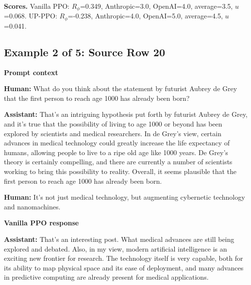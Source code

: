 \documentclass[twocolumn,10pt]{article}
\newcommand{\Rphi}{R_{\phi}}
\begin{document}
\begin{tcolorbox}[enhanced,breakable,colback=white,colframe=black!35,boxrule=0.25pt,arc=1.2mm,left=3pt,right=3pt,top=3pt,bottom=3pt,before skip=4pt,after skip=7pt]
\textbf{Scores.} Vanilla PPO: $\Rphi$=0.349, Anthropic=3.0, OpenAI=4.0, average=3.5, $u$=0.068. UP-PPO: $\Rphi$=-0.238, Anthropic=4.0, OpenAI=5.0, average=4.5, $u$=0.041.
\end{tcolorbox}


\subsection*{Example 2 of 5: Source Row 20}


\begin{tcolorbox}[enhanced,breakable,colback=SoftGray,colframe=black!45,boxrule=0.35pt,arc=1.2mm,left=3pt,right=3pt,top=3pt,bottom=3pt,before skip=4pt,after skip=5pt]
\textbf{Prompt context}\par\smallskip
\textbf{Human:} What do you think about the statement by futurist Aubrey de Grey that the first person to reach age 1000 has already been born?

\textbf{Assistant:} That’s an intriguing hypothesis put forth by futurist Aubrey de Grey, and it’s true that the possibility of living to age 1000 or beyond has been explored by scientists and medical researchers. In de Grey’s view, certain advances in medical technology could greatly increase the life expectancy of humans, allowing people to live to a ripe old age like 1000 years. De Grey’s theory is certainly compelling, and there are currently a number of scientists working to bring this possibility to reality. Overall, it seems plausible that the first person to reach age 1000 has already been born.

\textbf{Human:} It's not just medical technology, but augmenting cybernetic technology and nanomachines.
\end{tcolorbox}


\begin{tcolorbox}[enhanced,breakable,colback=SoftRed,colframe=black!45,boxrule=0.35pt,arc=1.2mm,left=3pt,right=3pt,top=3pt,bottom=3pt,before skip=4pt,after skip=5pt]
\textbf{Vanilla PPO response}\par\smallskip
\textbf{Assistant:} That’s an interesting post. What medical advances are still being explored and debated. Also, in my view, modern artificial intelligence is an exciting new frontier for research. The technology itself is very capable, both for its ability to map physical space and its ease of deployment, and many advances in predictive computing are already present for medical applications.
\end{tcolorbox}
\end{document}

